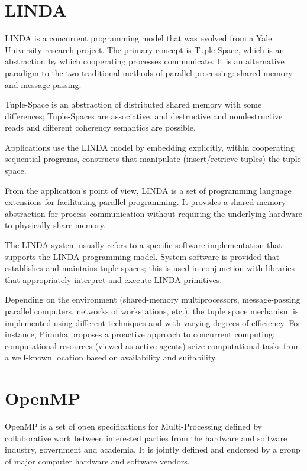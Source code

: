 \section{LINDA}
LINDA is a concurrent programming model that was evolved from a Yale University research project. The primary concept is Tuple-Space, which is an abstraction by which cooperating processes communicate. It is an alternative paradigm to the two traditional methods of parallel processing: shared memory and message-passing.

Tuple-Space is an abstraction of distributed shared memory with some differences; Tuple-Spaces are associative, and destructive and nondestructive reads and different coherency semantics are possible.

Applications use the LINDA model by embedding explicitly, within cooperating sequential programs, constructs that manipulate (insert/retrieve tuples) the tuple space.

From the application's point of view, LINDA is a set of programming language extensions for facilitating parallel programming. It provides a shared-memory abstraction for process communication without requiring the underlying hardware to physically share memory. 

The LINDA system usually refers to a specific software implementation that supports the LINDA programming model. System software is provided that establishes and maintains tuple spaces; this is used in conjunction with libraries that appropriately interpret and execute LINDA primitives.

Depending on the environment (shared-memory multiprocessors, message-passing parallel computers, networks of workstations, etc.), the tuple space mechanism is implemented using different techniques and with varying degrees of efficiency. For instance, Piranha proposes a proactive approach to concurrent computing: computational resources (viewed as active agents) seize computational tasks from a well-known location based on availability and suitability.

\section{OpenMP}
OpenMP is a set of open specifications for Multi-Processing defined by collaborative work between interested parties from the hardware and software industry, government and academia. It is jointly defined and endorsed by a group of major computer hardware and software vendors.

